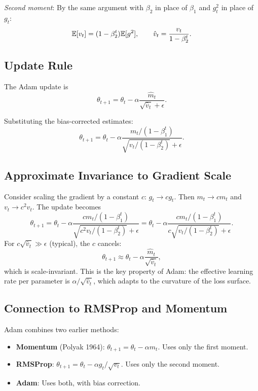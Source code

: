 \emph{Second moment}: By the same argument with $\beta_2$ in place of
$\beta_1$ and $g_t^2$ in place of $g_t$:
\[
\mathbb{E}[v_t] = (1 - \beta_2^t) \mathbb{E}[g^2], \qquad \hat{v}_t = \frac{v_t}{1 - \beta_2^t}.
\]

\subsection{Update Rule}

The Adam update is
\[
\theta_{t+1} = \theta_t - \alpha \frac{\hat{m}_t}{\sqrt{\hat{v}_t} + \epsilon}.
\]

Substituting the bias-corrected estimates:
\[
\theta_{t+1} = \theta_t - \alpha \frac{m_t / (1 - \beta_1^t)}{\sqrt{v_t / (1 - \beta_2^t)} + \epsilon}.
\]


\subsection{Approximate Invariance to Gradient Scale}

Consider scaling the gradient by a constant $c$: $g_t \to c g_t$. Then
$m_t \to c m_t$ and $v_t \to c^2 v_t$. The update becomes
\[
\theta_{t+1} = \theta_t - \alpha \frac{c m_t / (1 - \beta_1^t)}{\sqrt{c^2 v_t / (1 - \beta_2^t)} + \epsilon} = \theta_t - \alpha \frac{c m_t / (1 - \beta_1^t)}{c \sqrt{v_t / (1 - \beta_2^t)} + \epsilon}.
\]
For $c \sqrt{\hat{v}_t} \gg \epsilon$ (typical), the $c$ cancels:
\[
\theta_{t+1} \approx \theta_t - \alpha \frac{\hat{m}_t}{\sqrt{\hat{v}_t}},
\]
which is scale-invariant. This is the key property of Adam: the
effective learning rate per parameter is $\alpha / \sqrt{\hat{v}_t}$,
which adapts to the curvature of the loss surface.

\subsection{Connection to RMSProp and Momentum}

Adam combines two earlier methods:
\begin{itemize}
    \item \textbf{Momentum} (Polyak 1964): $\theta_{t+1} = \theta_t -
          \alpha m_t$. Uses only the first moment.
    \item \textbf{RMSProp}: $\theta_{t+1} = \theta_t - \alpha g_t /
          \sqrt{v_t}$. Uses only the second moment.
    \item \textbf{Adam}: Uses both, with bias correction.
\end{itemize}

